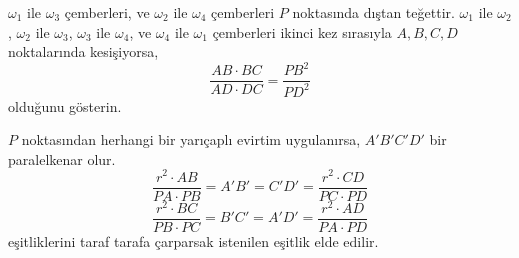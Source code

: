 \documentclass[12pt]{scrartcl}
\begin{document}
\begin{problem}
    $\omega_1$ ile $\omega_3$ çemberleri, ve $\omega_2$ ile $\omega_4$ çemberleri $P$ noktasında dıştan teğettir. $\omega_1$ ile $\omega_2$, $\omega_2$ ile $\omega_3$, $\omega_3$ ile $\omega_4$, ve $\omega_4$ ile $\omega_1$ çemberleri ikinci kez sırasıyla $A,B,C,D$ noktalarında kesişiyorsa, $$\frac{AB\cdot BC}{AD\cdot DC}=\frac{PB^2}{PD^2}$$ olduğunu gösterin.
\end{problem}

\begin{minipage}{0.45\textwidth}
    \begin{answer*}
        $P$ noktasından herhangi bir yarıçaplı evirtim uygulanırsa, $A'B'C'D'$ bir paralelkenar olur.
        $$\frac{r^2\cdot AB}{PA\cdot PB}=A'B'=C'D'=\frac{r^2\cdot CD}{PC\cdot PD}$$
        $$\frac{r^2\cdot BC}{PB\cdot PC}=B'C'=A'D'=\frac{r^2\cdot AD}{PA\cdot PD}$$
        eşitliklerini taraf tarafa çarparsak istenilen eşitlik elde edilir.
    \end{answer*}
\end{minipage}
\hspace{1cm}
\end{document}
